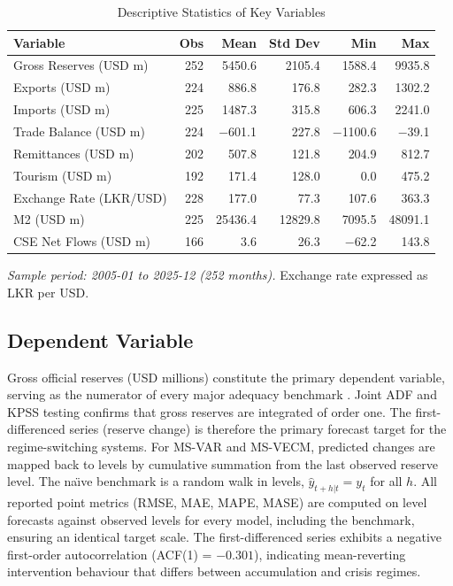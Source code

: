 \documentclass[12pt,a4paper]{article}
\begin{document}
\begin{table}[htbp]
\centering
\caption{Descriptive Statistics of Key Variables}
\label{tab:descriptive}
\begin{tabular}{lrrrrr}
\toprule
Variable & Obs & Mean & Std Dev & Min & Max \\
\midrule
Gross Reserves (USD m) & 252 & 5450.6 & 2105.4 & 1588.4 & 9935.8 \\
Exports (USD m) & 224 & 886.8 & 176.8 & 282.3 & 1302.2 \\
Imports (USD m) & 225 & 1487.3 & 315.8 & 606.3 & 2241.0 \\
Trade Balance (USD m) & 224 & $-$601.1 & 227.8 & $-$1100.6 & $-$39.1 \\
Remittances (USD m) & 202 & 507.8 & 121.8 & 204.9 & 812.7 \\
Tourism (USD m) & 192 & 171.4 & 128.0 & 0.0 & 475.2 \\
Exchange Rate (LKR/USD) & 228 & 177.0 & 77.3 & 107.6 & 363.3 \\
M2 (USD m) & 225 & 25436.4 & 12829.8 & 7095.5 & 48091.1 \\
CSE Net Flows (USD m) & 166 & 3.6 & 26.3 & $-$62.2 & 143.8 \\
\bottomrule
\end{tabular}
\begin{tablenotes}
\small
\item \textit{Sample period: 2005-01 to 2025-12 (252 months).} Exchange rate expressed as LKR per USD.
\end{tablenotes}
\end{table}

\subsection{Dependent Variable}

Gross official reserves (USD millions) constitute the primary dependent variable, serving as the numerator of every major adequacy benchmark \citep{JeanneRanciere2011,Obstfeld2010}. Joint ADF and KPSS testing confirms that gross reserves are integrated of order one. The first-differenced series (reserve change) is therefore the primary forecast target for the regime-switching systems. For MS-VAR and MS-VECM, predicted changes are mapped back to levels by cumulative summation from the last observed reserve level. The na\"{\i}ve benchmark is a random walk in levels, $\hat{y}_{t+h|t}=y_t$ for all $h$. All reported point metrics (RMSE, MAE, MAPE, MASE) are computed on level forecasts against observed levels for every model, including the benchmark, ensuring an identical target scale. The first-differenced series exhibits a negative first-order autocorrelation (ACF(1) = $-0.301$), indicating mean-reverting intervention behaviour that differs between accumulation and crisis regimes.
\end{document}
